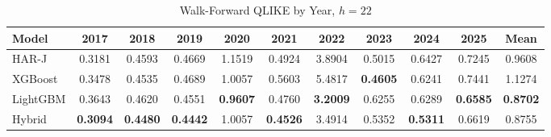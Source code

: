\begin{table}[htbp]
\centering
\caption{Walk-Forward QLIKE by Year, $h=22$}
\label{tab:wf_qlike_h22}
\begin{tabular}{lcccccccccc}
\hline
Model & 2017 & 2018 & 2019 & 2020 & 2021 & 2022 & 2023 & 2024 & 2025 & Mean \\
\hline
HAR-J & 0.3181 & 0.4593 & 0.4669 & 1.1519 & 0.4924 & 3.8904 & 0.5015 & 0.6427 & 0.7245 & 0.9608 \\
XGBoost & 0.3478 & 0.4535 & 0.4689 & 1.0057 & 0.5603 & 5.4817 & \textbf{0.4605} & 0.6241 & 0.7441 & 1.1274 \\
LightGBM & 0.3643 & 0.4620 & 0.4551 & \textbf{0.9607} & 0.4760 & \textbf{3.2009} & 0.6255 & 0.6289 & \textbf{0.6585} & \textbf{0.8702} \\
Hybrid & \textbf{0.3094} & \textbf{0.4480} & \textbf{0.4442} & 1.0057 & \textbf{0.4526} & 3.4914 & 0.5352 & \textbf{0.5311} & 0.6619 & 0.8755 \\
\hline
\end{tabular}
\end{table}
